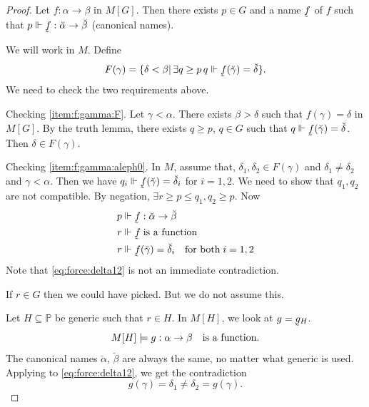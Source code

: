 \documentclass[11pt,pdftex,twoside,a4paper]{article}
\newcommand{\dsP}{\ensuremath{\mathds{P}}}
\newcommand{\forces}{\ensuremath{\Vdash}}
\newcommand{\utilde}[1]{\ensuremath{\underaccent{\tilde}{#1}}}
\theoremstyle{definition}
\begin{document}
\begin{proof}
Let \(f:\alpha\to\beta\) in \(M[G]\). Then there exists \(p\in G\)
and a name \utilde{f} of $f$ such that
 \(p \forces \utilde{f}:\breve{\alpha}\to\breve{\beta}\)
(canonical names).

We will work in $M$. Define
\begin{equation*}
F(\gamma) = \{\delta<\beta|\,\exists q\geq p\, q\forces
  \utilde{f}(\breve{\gamma})=\breve{\delta}\}.
\end{equation*}
We need to check the two requirements above.

Checking \ref{item:f:gamma:F}.
Let \(\gamma<\alpha\). There exists \(\beta>\delta\) such that
\(f(\gamma)=\delta\) in \(M[G]\).
By the truth lemma, there exists \(q\geq p\), \(q\in G\) such that
\(q\forces \utilde{f}(\breve{\gamma})=\breve{\delta}\).
Then \(\delta\in F(\gamma)\).

Checking \ref{item:f:gamma:aleph0}.
In $M$, assume that, \(\delta_1,\delta_2\in F(\gamma)\)
and \(\delta_1\neq\delta_2\) and \(\gamma<\alpha\).
Then we have \(q_i \forces \utilde{f}(\breve{\gamma})=\breve{\delta}_i\)
for \(i=1,2\).
We need to show that \(q_1,q_2\) are not compatible.
By negation, \(\exists r\geq p\leq q_1,q_2 \geq p\).
Now
\begin{align}
p & \forces \utilde{f}: \breve{\alpha} \to \breve{\beta} \nonumber \\
r & \forces \utilde{f} \; \textnormal{is a function} \nonumber \\
r & \forces \utilde{f}(\breve{\gamma}) = \breve{\delta}_i
    \quad \textnormal{for both}\; i=1,2 \label{eq:force:delta12}
\end{align}
Note that \eqref{eq:force:delta12} is not an immediate contradiction.

If \(r\in G\) then we could have picked. But we do not assume this.

Let \(H\subseteq \dsP\) be generic such that \(r\in H\).
In \(M[H]\), we look at \(g = \utilde{g}_H\).
\begin{equation*}
 M[H] \models g: \alpha\to \beta \quad \textnormal{is a function}.
\end{equation*}
The canonical names \(\breve{\alpha}\), \(\breve{\beta}\)
are always the same, no matter what generic is used.
Applying to \eqref{eq:force:delta12}, we get the contradiction
\begin{equation*}
g(\gamma) = \delta_1 \neq \delta_2 = g(\gamma).
\end{equation*}
\end{proof}
\end{document}
